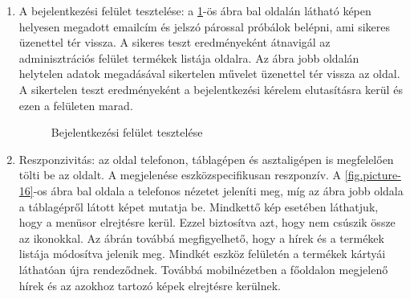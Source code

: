 \begin{enumerate}
	\item\label{step:first} A bejelentkezési felület tesztelése: a \ref{fig.picture-15}-ös ábra bal oldalán látható képen helyesen megadott emailcím és jelszó párossal próbálok belépni, ami sikeres üzenettel tér vissza. A sikeres teszt eredményeként átnavigál az adminisztrációs felület termékek listája oldalra. Az ábra jobb oldalán helytelen adatok megadásával sikertelen művelet üzenettel tér vissza az oldal. A sikertelen teszt eredményeként a bejelentkezési kérelem elutasításra kerül és ezen a felületen marad.
	\begin{figure}[H]
		\centering
		\hspace{5pt}
		\caption{Bejelentkezési felület tesztelése}
		\label{fig.picture-15}
	\end{figure}
	\item Reszponzivitás: az oldal telefonon, táblagépen és asztaligépen is megfelelően tölti be az oldalt. A megjelenése eszközspecifikusan reszponzív. A \ref{fig.picture-16}-os ábra bal oldala a telefonos nézetet jeleníti meg, míg az ábra jobb oldala a táblagépről látott képet mutatja be. Mindkettő kép esetében láthatjuk, hogy a menüsor elrejtésre kerül. Ezzel biztosítva azt, hogy nem csúszik össze az ikonokkal. Az ábrán továbbá megfigyelhető, hogy a hírek és a termékek listája módosítva jelenik meg. Mindkét eszköz felületén a termékek kártyái láthatóan újra rendeződnek. Továbbá mobilnézetben a főoldalon megjelenő hírek és az azokhoz tartozó képek elrejtésre kerülnek.

\end{enumerate}
